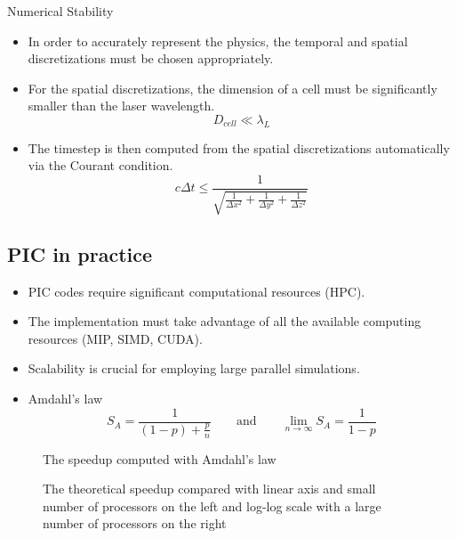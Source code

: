 \documentclass{beamer}
\begin{document}

\begin{frame}{Numerical Stability}
  \begin{itemize}
    \item In order to accurately represent the physics, the temporal
		and spatial discretizations must be chosen appropriately.
		\item For the spatial discretizations, the dimension of a cell must be
		significantly smaller than the laser wavelength.
		\[
		D_{cell} \ll \lambda_L
		\]
		\item The timestep is then computed from the spatial discretizations
		automatically via the Courant condition.
		\[
		c \Delta t \leq \frac{1}{\sqrt{\frac{1}{\Delta x^2} + \frac{1}{\Delta y^2} + \frac{1}{\Delta z^2}}}
		\]
  \end{itemize}
\end{frame}


\subsection{PIC in practice}

\begin{frame}
	\begin{itemize}
		\item PIC codes require significant computational resources (HPC).
		\item The implementation must take advantage of all the available
		computing resources (MIP, SIMD, CUDA).
		\item Scalability is crucial for employing large parallel simulations.
		\item Amdahl's law
		\[
		S_A = \frac{1}{(1-p)+\frac{p}{n}}
		\qquad \text{and} \qquad
		\lim_{n\to\infty} S_A = \frac{1}{1-p}
		\]
	\end{itemize}
\end{frame}


\begin{frame}
	\begin{figure}
		\caption{The speedup computed with Amdahl's law}
	\end{figure}
\end{frame}

%
\begin{frame}
	\begin{figure}
		\caption{The theoretical speedup compared with linear axis and small number
	  of processors on the left and log-log scale with a large number of processors
	  on the right}
	\end{figure}
\end{frame}
\end{document}
